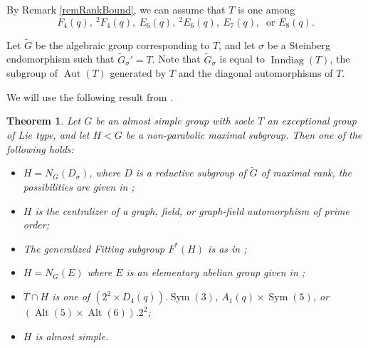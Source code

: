 \documentclass[11pt]{amsart}
\numberwithin{equation}{section}
\newtheorem{theorem}{Theorem}[section]
\theoremstyle{definition}
\theoremstyle{remark}
\newcommand{\Sym}{\mathop{\mathrm{Sym}}}
\newcommand{\Alt}{\mathop{\mathrm{Alt}}}
\newcommand{\Aut}{\mathop{\mathrm{Aut}}}
\begin{document}
By Remark \ref{remRankBound},
we can assume that $T$ is one among
$$ F_4(q) , \> ^2F_4(q) , \>
E_6(q) , \> ^2E_6(q) , \>
E_7(q) , \> \mbox{ or } E_8(q) . $$

Let $\widetilde G$ be the algebraic group corresponding to $T$, and let $\sigma$ be a Steinberg endomorphism such that $\widetilde G_\sigma' = T$. Note that $\widetilde G_\sigma$ is equal to $\operatorname{Inndiag}(T)$, the subgroup of $\Aut(T)$ generated by $T$ and the diagonal automorphisms of $T$.

We will use the following result from \cite{LS90}.

\begin{theorem}{\cite[Th.~2]{LS90}} \label{theorem:maxclassification}
    Let $G$ be an almost simple group with socle $T$ an exceptional group of Lie type, and let $H<G$ be a non-parabolic maximal subgroup.
    Then one of the following holds:
    \begin{itemize}
        \item[(i)] $H = N_G(D_\sigma)$, where $D$ is a reductive subgroup of $\widetilde G$ of maximal rank, the possibilities are given in \cite[Tab.~5.1, 5.2]{LSS90};
        \item[(ii)] $H$ is the centralizer of a graph, field, or graph-field automorphism of prime order;
        \item[(iii)] The generalized Fitting subgroup $F^*(H)$ is as in \cite[Tab.~III]{LS90};
        \item[(iv)] $H = N_G(E)$ where $E$ is an elementary abelian group given in \cite[Th.~1(II)]{CLSS92};
        \item[(v)] $T \cap H$ is one of $(2^2 \times D_4(q)) . \Sym(3)$, $A_1(q) \times \Sym(5)$, or $(\Alt(5) \times \Alt(6)).2^2$;
        \item[(vi)] $H$ is almost simple.
    \end{itemize}
\end{theorem}
\end{document}
